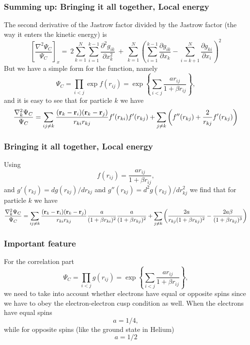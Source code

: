 \frame
{
  \frametitle{Summing up: Bringing it all together, Local energy}
\begin{small}
{\scriptsize

The second derivative of the Jastrow factor divided by the Jastrow factor (the way it enters the kinetic energy) is
\[
\left[\frac{\nabla^2 \Psi_C}{\Psi_C}\right]_x =\  
2\sum_{k=1}^{N}
\sum_{i=1}^{k-1}\frac{\partial^2 g_{ik}}{\partial x_k^2}\ +\ 
\sum_{k=1}^N
\left(
\sum_{i=1}^{k-1}\frac{\partial g_{ik}}{\partial x_k} -
\sum_{i=k+1}^{N}\frac{\partial g_{ki}}{\partial x_i}
\right)^2
\]
But we have a simple form for the function, namely
\[
\Psi_{C}=\prod_{i< j}\exp{f(r_{ij})}= \exp{\left\{\sum_{i<j}\frac{ar_{ij}}{1+\beta r_{ij}}\right\}},
\]
and it is easy to see that for particle  $k$
we have
\[
  \frac{\nabla^2_k \Psi_C}{\Psi_C }=
\sum_{ij\ne k}\frac{({\bf r}_k-{\bf r}_i)({\bf r}_k-{\bf r}_j)}{r_{ki}r_{kj}}f'(r_{ki})f'(r_{kj})+
\sum_{j\ne k}\left( f''(r_{kj})+\frac{2}{r_{kj}}f'(r_{kj})\right)
\]
}
\end{small}
}



\frame
{
  \frametitle{Bringing it all together, Local energy}
\begin{small}
{\scriptsize
Using 
\[
f(r_{ij})= \frac{ar_{ij}}{1+\beta r_{ij}},
\]
and $g'(r_{kj})=dg(r_{kj})/dr_{kj}$ and 
$g''(r_{kj})=d^2g(r_{kj})/dr_{kj}^2$  we find that for particle  $k$
we have
\[
  \frac{\nabla^2_k \Psi_C}{\Psi_C }=
\sum_{ij\ne k}\frac{({\bf r}_k-{\bf r}_i)({\bf r}_k-{\bf r}_j)}{r_{ki}r_{kj}}\frac{a}{(1+\beta r_{ki})^2}
\frac{a}{(1+\beta r_{kj})^2}+
\sum_{j\ne k}\left(\frac{2a}{r_{kj}(1+\beta r_{kj})^2}-\frac{2a\beta}{(1+\beta r_{kj})^3}\right)
\]
}
\end{small}
}

\frame
{
  \frametitle{Important feature}
\begin{small}
{\scriptsize
For the correlation part 
\[
\Psi_C=\prod_{i< j}g(r_{ij})= \exp{\left\{\sum_{i<j}\frac{ar_{ij}}{1+\beta r_{ij}}\right\}},
\]
we need to take into account whether electrons have equal or opposite spins since we have to obey the
electron-electron cusp condition as well.  
When the electrons have  equal spins 
\[
a= 1/4,
\]
while for opposite spins (like the ground state in Helium)
\[
a= 1/2
\] 
}
\end{small}
}


